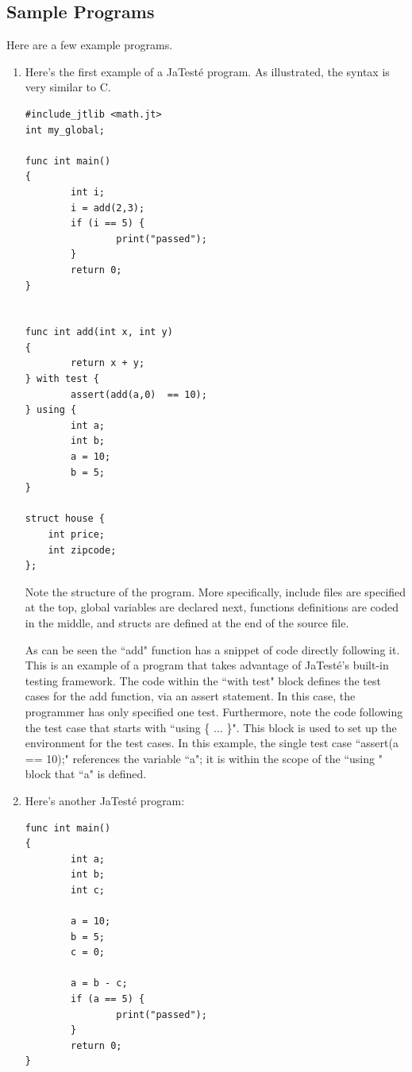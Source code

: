 \documentclass{article}
\begin{document}
\subsection{Sample Programs}
Here are a few example programs.
\begin{enumerate}
\item Here's the first example of a JaTest\'{e} program. As illustrated, the syntax is very similar to C. 
\begin{lstlisting}
#include_jtlib <math.jt>
int my_global;

func int main()
{
        int i;
        i = add(2,3);
        if (i == 5) {
                print("passed");
        }
        return 0;
}


func int add(int x, int y)
{
        return x + y;
} with test {
        assert(add(a,0)  == 10);
} using {
        int a;
        int b;
        a = 10;
        b = 5;
}

struct house {
    int price;
    int zipcode;
};
\end{lstlisting}
Note the structure of the program. More specifically, include files are specified at the top, global variables are declared next, functions definitions are coded in the middle, and structs are defined at the end of the source file. 
\par
As can be seen the ``add" function has a snippet of code directly following it. This is an example of a program that takes advantage of JaTest\'{e}'s built-in testing framework. The code within the ``with test" block defines the test cases for the add function, via an assert statement. In this case, the programmer has only specified one test. Furthermore, note the code following the test case that starts with ``using \{ $\ldots $ \}". This block is used to set up the environment for the test cases. In this example, the single test case ``assert(a == 10);" references the variable ``a"; it is within the scope of the ``using " block that ``a" is defined. 
\item
Here's another JaTest\'{e} program: \\
\begin{lstlisting}
func int main()
{
        int a;
        int b;
        int c;

        a = 10;
        b = 5;
        c = 0;

        a = b - c;
        if (a == 5) {
                print("passed");
        }
        return 0;
}



\end{lstlisting}
\end{enumerate}
\end{document}
